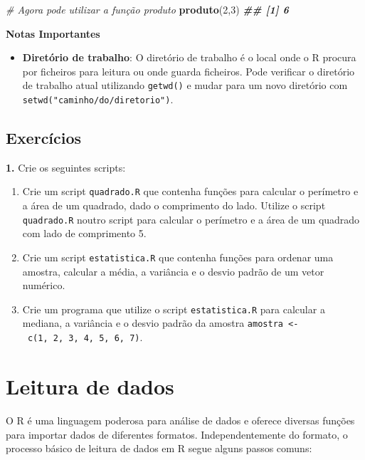 \documentclass[
]{book}
\newenvironment{Shaded}{\begin{snugshade}}{\end{snugshade}}
\newcommand{\CommentTok}[1]{\textcolor[rgb]{0.56,0.35,0.01}{\textit{#1}}}
\newcommand{\DecValTok}[1]{\textcolor[rgb]{0.00,0.00,0.81}{#1}}
\newcommand{\DocumentationTok}[1]{\textcolor[rgb]{0.56,0.35,0.01}{\textbf{\textit{#1}}}}
\newcommand{\FunctionTok}[1]{\textcolor[rgb]{0.13,0.29,0.53}{\textbf{#1}}}
\newcommand{\NormalTok}[1]{#1}
\providecommand{\tightlist}{%
  \setlength{\itemsep}{0pt}\setlength{\parskip}{0pt}}
\begin{document}
\begin{Shaded}
\begin{Highlighting}[]
\CommentTok{\# Agora pode utilizar a função \textquotesingle{}produto\textquotesingle{}}
\FunctionTok{produto}\NormalTok{(}\DecValTok{2}\NormalTok{,}\DecValTok{3}\NormalTok{)}
\DocumentationTok{\#\# [1] 6}
\end{Highlighting}
\end{Shaded}

\textbf{Notas Importantes}

\begin{itemize}
\tightlist
\item
  \textbf{Diretório de trabalho}: O diretório de trabalho é o local onde o
  R procura por ficheiros para leitura ou onde guarda ficheiros. Pode
  verificar o diretório de trabalho atual utilizando \texttt{getwd()} e mudar
  para um novo diretório com \texttt{setwd("caminho/do/diretorio")}.
\end{itemize}

\section{Exercícios}\label{exercuxedcios-8}

\textbf{1.} Crie os seguintes scripts:

\begin{enumerate}
\def\labelenumi{(\alph{enumi})}
\item
  Crie um script \texttt{quadrado.R} que contenha funções para calcular o
  perímetro e a área de um quadrado, dado o comprimento do lado.
  Utilize o script \texttt{quadrado.R} noutro script para calcular o
  perímetro e a área de um quadrado com lado de comprimento 5.
\item
  Crie um script \texttt{estatistica.R} que contenha funções para ordenar uma
  amostra, calcular a média, a variância e o desvio padrão de um vetor
  numérico.
\item
  Crie um programa que utilize o script \texttt{estatistica.R} para calcular
  a mediana, a variância e o desvio padrão da amostra
  \texttt{amostra\ \textless{}-\ c(1,\ 2,\ 3,\ 4,\ 5,\ 6,\ 7)}.
\end{enumerate}

\chapter{Leitura de dados}\label{leitura-de-dados}

O R é uma linguagem poderosa para análise de dados e oferece diversas
funções para importar dados de diferentes formatos. Independentemente do
formato, o processo básico de leitura de dados em R segue alguns passos
comuns:
\end{document}
